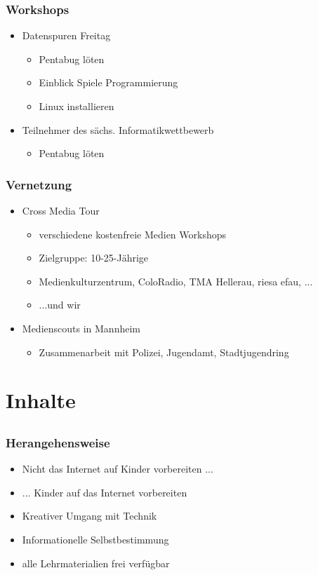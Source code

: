 \documentclass[12pt]{beamer}
\begin{document}
\begin{frame}
  \frametitle{Workshops}
  \begin{itemize}
    \item<2-> Datenspuren Freitag
    \begin{itemize}
      \item<2-> Pentabug löten
      \item<2-> Einblick Spiele Programmierung
      \item<2-> Linux installieren
    \end{itemize}
    \item<3-> Teilnehmer des sächs. Informatikwettbewerb
    \begin{itemize}
      \item<3-> Pentabug löten
    \end{itemize}
  \end{itemize}
\end{frame}

\begin{frame}
  \frametitle{Vernetzung}
  \begin{itemize}
    \item<2-> Cross Media Tour
    \begin{itemize}
      \item<3-> verschiedene kostenfreie Medien Workshops
      \item<4-> Zielgruppe: 10-25-Jährige
      \item<5-> Medienkulturzentrum, ColoRadio, TMA Hellerau, riesa efau, ...
      \item<6-> ...und wir
    \end{itemize}
    \item<7-> Medienscouts in Mannheim
    \begin{itemize}
      \item<7-> Zusammenarbeit mit Polizei, Jugendamt, Stadtjugendring
    \end{itemize}
  \end{itemize}
\end{frame}

\section{Inhalte}
\subsection{}

\begin{frame}
  \frametitle{Herangehensweise}
  \begin{itemize}
    \item<2-> Nicht das Internet auf Kinder vorbereiten ...
    \item<3-> ... Kinder auf das Internet vorbereiten
    \item<4-> Kreativer Umgang mit Technik
    \item<5-> Informationelle Selbstbestimmung
    \item<6-> alle Lehrmaterialien frei verfügbar
  \end{itemize}
\end{frame}
\end{document}
